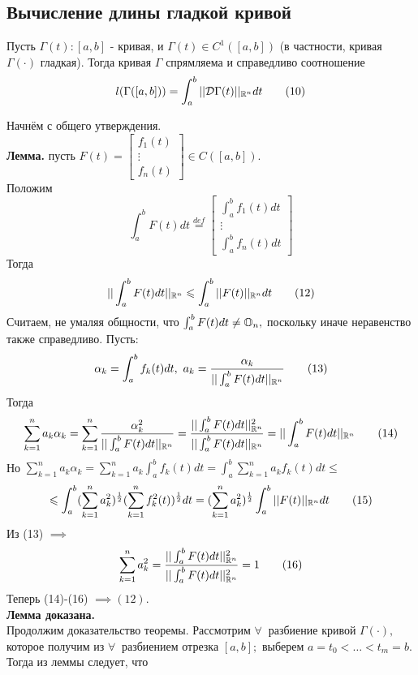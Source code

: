 \documentclass[main]{subfiles}
\begin{document}
\subsection{Вычисление длины гладкой кривой}
\begin{theorem}
     Пусть $\Gamma(t):[a,b]$ - кривая, и $\Gamma(t)\in C^1([a,b])$ (в частности, кривая $\Gamma(\cdot)$ гладкая). Тогда кривая $\Gamma$ спрямляема и справедливо соотношение
\[ l(\Gamma([a,b]))=\int_a^b||\mathcal{D}\Gamma(t)||_{\mathbb{R}^n} dt \tag{10} \] 
\end{theorem}
\begin{longProof}
     Начнём с общего утверждения.
\\ \textbf{Лемма.} пусть $F(t)=\begin{bmatrix}
f_1(t)\\\vdots\\f_n(t)
\end{bmatrix}\in C([a,b]).$\\
Положим \[\int_a^b F(t)dt\overset{def}{=}\begin{bmatrix}\int_a^b f_1(t)dt\\\vdots\\\int_a^b f_n(t)dt\end{bmatrix}\tag{11}\]
Тогда \[ ||\int_a^b F(t)dt||_{\mathbb{R}^n}\leqslant \int_a^b ||F(t)||_{\mathbb{R}^n} dt\tag{12}\]
 Считаем, не умаляя общности, что $\int_a^b F(t)dt\ne\mathbb{O}_n,$ поскольку иначе неравенство также справедливо. Пусть: \[ \alpha_k =\int_a^b f_k(t)dt,\ a_k=\frac{\alpha_k}{||\int_a^b F(t)dt||_{\vR^n}}\tag{13}\]
Тогда \[ \sum\limits_{k=1}^n a_k\alpha_k=\sum\limits_{k=1}^n \frac{\alpha_k^2}{||\int_a^b F(t)dt||_{\mathbb{R}^n}}=\frac{||\int_a^b F(t)dt||^2_{\mathbb{R}^n}}{||\int_a^b F(t)dt||_{\mathbb{R}^n}}=||\int_a^b F(t)dt||_{\mathbb{R}^n}\tag{14}\]
Но \( \sum\limits_{k=1}^n a_k\alpha_k=\sum\limits_{k=1}^n a_k\int_a^b f_k(t)dt=\int_a^b\sum\limits_{k=1}^n a_k f_k(t)dt\leq\) \[ \leqslant \int_a^b(\sum\limits_{k=1}^n a_k^2)^\frac{1}{2}(\sum\limits_{k=1}^n f_k^2(t))^\frac{1}{2}dt=(\sum\limits_{k=1}^n a_k^2)^\frac{1}{2}\int_a^b|| F(t)||_{\mathbb{R}^n} dt\tag{15} \]
Из (13) $\implies$ \[ \sum\limits_{k=1}^n a_k^2=\frac{||\int_a^b F(t)dt||_{\mathbb{R}^n}^2}{||\int_a^b F(t)dt||^2_{\mathbb{R}^n}}=1\tag{16} \]
Теперь (14)-(16) $\implies (12).$ \\\textbf{Лемма доказана.}\\
Продолжим доказательство теоремы.
Рассмотрим $\forall\ $ разбиение кривой $\Gamma(\cdot),$ которое получим из $\forall\ $
разбиением отрезка $[a,b];$ выберем $a=t_0<\dots<t_m=b.$ Тогда из леммы следует, что

\end{longProof}
\end{document}

